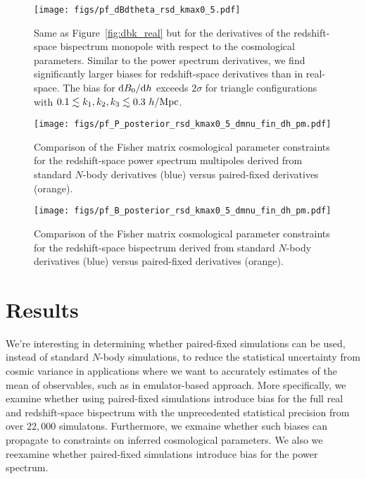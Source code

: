 \begin{figure}
\begin{center}
    \texttt{[image: figs/pf\_dBdtheta\_rsd\_kmax0\_5.pdf]}
    \caption{Same as Figure~\ref{fig:dbk_real} but for the derivatives of the
    redshift-space bispectrum monopole with respect to the cosmological parameters. 
    Similar to the power spectrum derivatives, we find significantly larger biases
    for redshift-space derivatives than in real-space. The bias for 
    ${\rm d} B_0/{\rm d}h$ exceeds $2\sigma$ for triangle configurations with 
    $0.1 \lesssim k_1, k_2, k_3 \lesssim 0.3~h/{\rm Mpc}$.  
    }
\label{fig:dbk_rsd}
\end{center}
\end{figure}

\begin{figure}
\begin{center}
    \texttt{[image: figs/pf\_P\_posterior\_rsd\_kmax0\_5\_dmnu\_fin\_dh\_pm.pdf]}
    \caption{Comparison of the Fisher matrix cosmological parameter constraints for the 
    redshift-space power spectrum multipoles derived from standard $N$-body derivatives 
    (blue) versus 
    paired-fixed derivatives (orange).}
\label{fig:ppost_rsd}
\end{center}
\end{figure}

\begin{figure}
\begin{center}
    \texttt{[image: figs/pf\_B\_posterior\_rsd\_kmax0\_5\_dmnu\_fin\_dh\_pm.pdf]}
    \caption{Comparison of the Fisher matrix cosmological parameter constraints for the 
    redshift-space bispectrum derived from standard $N$-body derivatives (blue) versus 
    paired-fixed derivatives (orange).
    } \label{fig:bpost_rsd}
\end{center}
\end{figure}

\section{Results} \label{sec:results} 
We're interesting in determining whether paired-fixed simulations can be used, instead of
standard $N$-body simulations, to reduce the statistical uncertainty from cosmic variance 
in applications where we want to accurately estimates of the mean of observables, such as
in emulator-based approach. More specifically, we examine whether using paired-fixed 
simulations introduce bias for the full real and redshift-space bispectrum with the 
unprecedented statistical precision from over $22,000$ \quij simulatons. Furthermore,
we exmaine whether such biases can propagate to constraints on inferred cosmological 
parameters. We also we reexamine whether paired-fixed simulations introduce bias for
the power spectrum. 

